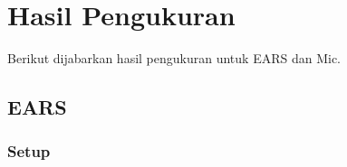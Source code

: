 \documentclass[12pt,]{article}
\begin{document}

	\newpage
	\section{Hasil Pengukuran}

	Berikut dijabarkan hasil pengukuran untuk EARS dan Mic.

	\subsection{EARS}

	\subsubsection{Setup}
\end{document}

